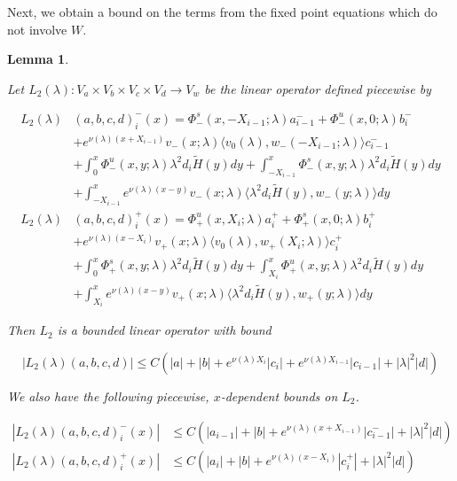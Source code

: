 \documentclass[12pt]{article}
\newtheorem{lemma}{Lemma}
\begin{document}
Next, we obtain a bound on the terms from the fixed point equations which do not involve $W$. 


\begin{lemma}\label{L2}

Let $L_2(\lambda): V_a \times V_b \times V_c \times V_d \rightarrow V_w$ be the linear operator defined piecewise by

\begin{align*}
L_2(\lambda)&(a,b,c,d)_i^-(x) = \Phi^s_-(x, -X_{i-1}; \lambda)a_{i-1}^- + \Phi^u_-(x, 0; \lambda)b_i^- \\
&+ e^{\nu(\lambda)(x+X_{i-1})} v_-(x; \lambda) \langle v_0(\lambda), w_-(-X_{i-1}; \lambda) \rangle c_{i-1}^- \\
&+ \int_0^x \Phi^u_-(x, y; \lambda)\lambda^2 d_i \tilde{H}(y) dy + \int_{-X_{i-1}}^x \Phi^s_-(x, y; \lambda) \lambda^2 d_i \tilde{H}(y) dy \\
&+ \int_{-X_{i-1}}^x
e^{\nu(\lambda)(x-y)} v_-(x; \lambda) \langle \lambda^2 d_i \tilde{H}(y), w_-(y; \lambda) \rangle dy \\
L_2(\lambda)&(a,b,c,d)_i^+(x) = \Phi^u_+(x, X_i; \lambda)a_i^+ + \Phi^s_+(x, 0; \lambda)b_i^+ \\
&+ e^{\nu(\lambda)(x - X_i)} v_+(x; \lambda) \langle v_0(\lambda), w_+(X_i; \lambda) \rangle c_i^+ \\
&+ \int_0^x \Phi^s_+(x, y; \lambda) \lambda^2 d_i \tilde{H}(y) dy + \int_{X_i}^x \Phi^u_+(x, y; \lambda) \lambda^2 d_i \tilde{H}(y) dy \\
&+ \int_{X_i}^x e^{\nu(\lambda)(x-y)} v_+(x; \lambda) \langle \lambda^2 d_i \tilde{H}(y), w_+(y; \lambda) \rangle dy
\end{align*}

Then $L_2$ is a bounded linear operator with bound

\begin{equation}\label{L2bound}
|L_2(\lambda)(a,b,c,d)| \leq C (|a| + |b| + e^{\nu(\lambda)X_i}|c_i| + e^{\nu(\lambda)X_{i-1}}|c_{i-1}| + |\lambda|^2 |d| )
\end{equation}

We also have the following piecewise, $x$-dependent bounds on $L_2$.

\begin{align*}
|L_2(\lambda)(a,b,c,d)_i^-(x)| &\leq C (|a_{i-1}| + |b| + e^{\nu(\lambda)(x + X_{i-1})}|c_{i-1}^-| + |\lambda|^2 |d| ) \\
|L_2(\lambda)(a,b,c,d)_i^+(x)| &\leq C (|a_i| + |b| + e^{\nu(\lambda)(x - X_i)}|c_i^+| + |\lambda|^2 |d| ) 
\end{align*}


\end{lemma}
\end{document}
